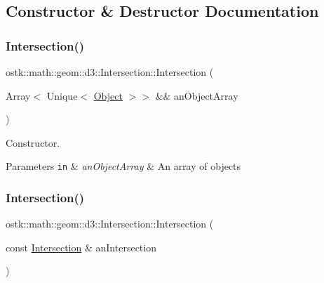 \subsection{Constructor \& Destructor Documentation}
\mbox{\label{classostk_1_1math_1_1geom_1_1d3_1_1_intersection_a6091ab689809d0da1e670ca18dffb2d8}} 
\subsubsection{\texorpdfstring{Intersection()}{Intersection()}\hspace{0.1cm}{\footnotesize\ttfamily [1/2]}}
{\footnotesize\ttfamily ostk\+::math\+::geom\+::d3\+::\+Intersection\+::\+Intersection (\begin{DoxyParamCaption}\item[{Array$<$ Unique$<$ \hyperlink{classostk_1_1math_1_1geom_1_1d3_1_1_object}{Object} $>$$>$ \&\&}]{an\+Object\+Array }\end{DoxyParamCaption})}



Constructor. 


\begin{DoxyParams}[1]{Parameters}
\mbox{\tt in}  & {\em an\+Object\+Array} & An array of objects \\
\hline
\end{DoxyParams}
\mbox{\label{classostk_1_1math_1_1geom_1_1d3_1_1_intersection_a96367deb3f86ecd53ab37c7993c7f390}} 
\subsubsection{\texorpdfstring{Intersection()}{Intersection()}\hspace{0.1cm}{\footnotesize\ttfamily [2/2]}}
{\footnotesize\ttfamily ostk\+::math\+::geom\+::d3\+::\+Intersection\+::\+Intersection (\begin{DoxyParamCaption}\item[{const \hyperlink{classostk_1_1math_1_1geom_1_1d3_1_1_intersection}{Intersection} \&}]{an\+Intersection }\end{DoxyParamCaption})}



